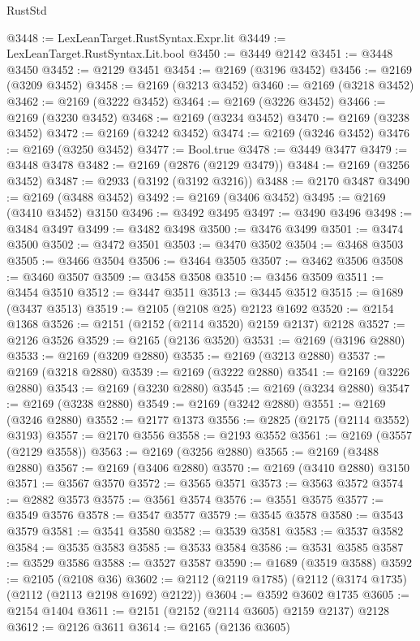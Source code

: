 \begin{lexlean}{RustStd}
\begin{coremodule}
@3448 := LexLeanTarget.RustSyntax.Expr.lit
@3449 := LexLeanTarget.RustSyntax.Lit.bool
@3450 := @3449 @2142
@3451 := @3448 @3450
@3452 := @2129 @3451
@3454 := @2169 (@3196 @3452)
@3456 := @2169 (@3209 @3452)
@3458 := @2169 (@3213 @3452)
@3460 := @2169 (@3218 @3452)
@3462 := @2169 (@3222 @3452)
@3464 := @2169 (@3226 @3452)
@3466 := @2169 (@3230 @3452)
@3468 := @2169 (@3234 @3452)
@3470 := @2169 (@3238 @3452)
@3472 := @2169 (@3242 @3452)
@3474 := @2169 (@3246 @3452)
@3476 := @2169 (@3250 @3452)
@3477 := Bool.true
@3478 := @3449 @3477
@3479 := @3448 @3478
@3482 := @2169 (@2876 (@2129 @3479))
@3484 := @2169 (@3256 @3452)
@3487 := @2933 (@3192 (@3192 @3216))
@3488 := @2170 @3487
@3490 := @2169 (@3488 @3452)
@3492 := @2169 (@3406 @3452)
@3495 := @2169 (@3410 @3452) @3150
@3496 := @3492 @3495
@3497 := @3490 @3496
@3498 := @3484 @3497
@3499 := @3482 @3498
@3500 := @3476 @3499
@3501 := @3474 @3500
@3502 := @3472 @3501
@3503 := @3470 @3502
@3504 := @3468 @3503
@3505 := @3466 @3504
@3506 := @3464 @3505
@3507 := @3462 @3506
@3508 := @3460 @3507
@3509 := @3458 @3508
@3510 := @3456 @3509
@3511 := @3454 @3510
@3512 := @3447 @3511
@3513 := @3445 @3512
@3515 := @1689 (@3437 @3513)
@3519 := @2105 (@2108 @25) @2123 @1692
@3520 := @2154 @1368
@3526 := @2151 (@2152 (@2114 @3520) @2159 @2137) @2128
@3527 := @2126 @3526
@3529 := @2165 (@2136 @3520)
@3531 := @2169 (@3196 @2880)
@3533 := @2169 (@3209 @2880)
@3535 := @2169 (@3213 @2880)
@3537 := @2169 (@3218 @2880)
@3539 := @2169 (@3222 @2880)
@3541 := @2169 (@3226 @2880)
@3543 := @2169 (@3230 @2880)
@3545 := @2169 (@3234 @2880)
@3547 := @2169 (@3238 @2880)
@3549 := @2169 (@3242 @2880)
@3551 := @2169 (@3246 @2880)
@3552 := @2177 @1373
@3556 := @2825 (@2175 (@2114 @3552) @3193)
@3557 := @2170 @3556
@3558 := @2193 @3552
@3561 := @2169 (@3557 (@2129 @3558))
@3563 := @2169 (@3256 @2880)
@3565 := @2169 (@3488 @2880)
@3567 := @2169 (@3406 @2880)
@3570 := @2169 (@3410 @2880) @3150
@3571 := @3567 @3570
@3572 := @3565 @3571
@3573 := @3563 @3572
@3574 := @2882 @3573
@3575 := @3561 @3574
@3576 := @3551 @3575
@3577 := @3549 @3576
@3578 := @3547 @3577
@3579 := @3545 @3578
@3580 := @3543 @3579
@3581 := @3541 @3580
@3582 := @3539 @3581
@3583 := @3537 @3582
@3584 := @3535 @3583
@3585 := @3533 @3584
@3586 := @3531 @3585
@3587 := @3529 @3586
@3588 := @3527 @3587
@3590 := @1689 (@3519 @3588)
@3592 := @2105 (@2108 @36)
@3602 := @2112 (@2119 @1785) (@2112 (@3174 @1735) (@2112 (@2113 @2198 @1692) @2122))
@3604 := @3592 @3602 @1735
@3605 := @2154 @1404
@3611 := @2151 (@2152 (@2114 @3605) @2159 @2137) @2128
@3612 := @2126 @3611
@3614 := @2165 (@2136 @3605)

\end{coremodule}
\end{lexlean}
